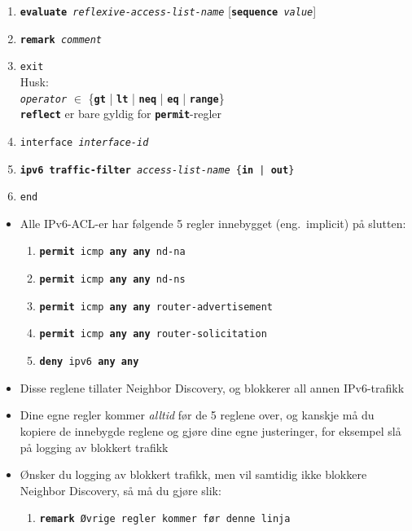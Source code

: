 \begin{frame}[allowframebreaks]
\begin{enumerate}
  \item \texttt{\textbf{evaluate} \textit{reflexive-access-list-name}}
    [\texttt{\textbf{sequence}~\textit{value}}]
  \item \texttt{\textbf{remark} \textit{comment}}
  \item \texttt{exit}\\
    Husk:\\
    \texttt{\textit{operator}} \(\in\) \{\texttt{\textbf{gt}} |
    \texttt{\textbf{lt}} | \texttt{\textbf{neq}} |
    \texttt{\textbf{eq}} | \texttt{\textbf{range}}\}\\
    \texttt{\textbf{reflect}} er bare gyldig for \texttt{\textbf{permit}}-regler
  \framebreak
  \item \texttt{interface \textit{interface-id}}
  \item \texttt{\textbf{ipv6 traffic-filter} \textit{access-list-name} \{\textbf{in} | \textbf{out}\}}
  \item \texttt{end}
  \end{enumerate}
  \framebreak
  \begin{itemize}
  \item Alle IPv6-ACL-er har følgende 5 regler innebygget
    (eng.~implicit) på slutten:
    \begin{enumerate}
    \item \texttt{\textbf{permit} icmp \textbf{any} \textbf{any} nd-na}
    \item \texttt{\textbf{permit} icmp \textbf{any} \textbf{any} nd-ns}
    \item \texttt{\textbf{permit} icmp \textbf{any} \textbf{any} router-advertisement}
    \item \texttt{\textbf{permit} icmp \textbf{any} \textbf{any} router-solicitation}
    \item \texttt{\textbf{deny\phantom{it}} ipv6 \textbf{any} \textbf{any}}
    \end{enumerate}
  \item Disse reglene tillater Neighbor Discovery, og blokkerer all
    annen IPv6-trafikk
  \item Dine egne regler kommer \textit{alltid\/} før de 5 reglene
    over, og kanskje må du kopiere de innebygde reglene og gjøre dine
    egne justeringer, for eksempel slå på logging av blokkert trafikk
  \framebreak
  \item Ønsker du logging av blokkert trafikk, men vil samtidig ikke
    blokkere Neighbor Discovery, så må du gjøre slik:
    \begin{enumerate}
    \item \texttt{\textbf{remark} Øvrige regler kommer før denne linja}

\end{enumerate}
\end{itemize}
\end{frame}
